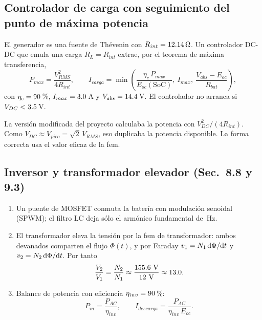 \documentclass[11pt]{article}
\begin{document}
\subsection{Controlador de carga con seguimiento del punto de máxima potencia}
El generador es una fuente de Thévenin con $R_{int}=12.14\,\Omega$. Un controlador DC-DC que
emula una carga $R_L=R_{int}$ extrae, por el teorema de máxima transferencia,
\begin{equation}
  P_{max}=\frac{V_{RMS}^2}{4R_{int}},\qquad
  I_{carga}=\min\!\left(\frac{\eta_c\,P_{max}}{E_{oc}(\text{SoC})},\ I_{max},\ \frac{V_{abs}-E_{oc}}{R_{bat}}\right),
\end{equation}
con $\eta_c=90$\,\%, $I_{max}=3.0$\,A y
$V_{abs}=14.4$\,V. El controlador no arranca si $V_{DC}<3.5$\,V.
\begin{nota}[Corrección]
La versión modificada del proyecto calculaba la potencia con $V_{DC}^2/(4R_{int})$. Como
$V_{DC}\approx V_{pico}=\sqrt2\,V_{RMS}$, eso duplicaba la potencia disponible. La forma correcta usa el valor
eficaz de la fem.
\end{nota}

\subsection{Inversor y transformador elevador (Sec.~8.8 y 9.3)}
\begin{enumerate}
  \item Un puente de MOSFET conmuta la batería con modulación senoidal (SPWM); el filtro LC deja sólo el
        armónico fundamental de \ValInversorFrecuencia\,Hz.
  \item El transformador eleva la tensión por la fem de transformador: ambos devanados comparten el flujo
        $\Phi(t)$, y por Faraday $v_1=N_1\,\mathrm{d}\Phi/\mathrm{d} t$ y $v_2=N_2\,\mathrm{d}\Phi/\mathrm{d} t$. Por tanto
        \begin{equation}
          \frac{V_2}{V_1}=\frac{N_2}{N_1}\approx\frac{\ValInversorPico\ \text{V}}{\ValBateriaTension\ \text{V}}
          \approx\ValRelacionEspiras .
        \end{equation}
  \item Balance de potencia con eficiencia $\eta_{inv}=90$\,\%:
        \begin{equation}
          P_{in}=\frac{P_{AC}}{\eta_{inv}},\qquad I_{descarga}=\frac{P_{AC}}{\eta_{inv}\,E_{oc}}.
        \end{equation}
\end{enumerate}
\end{document}
